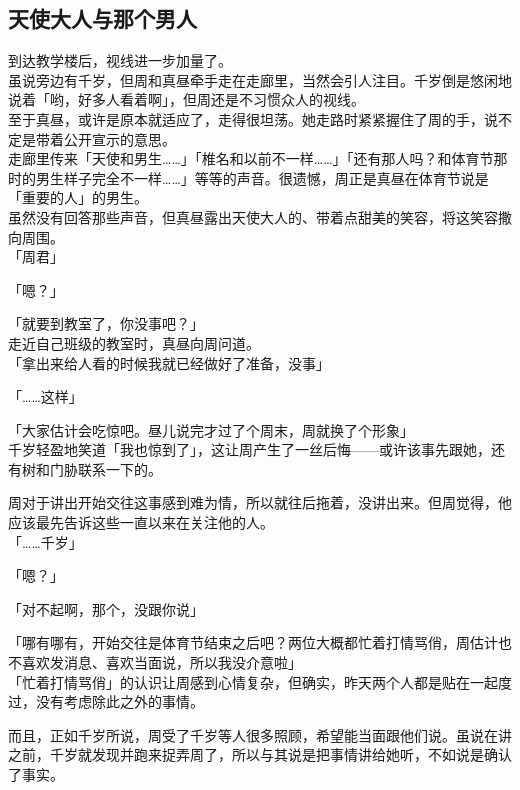 \subsection{天使大人与那个男人}

到达教学楼后，视线进一步加量了。\\

虽说旁边有千岁，但周和真昼牵手走在走廊里，当然会引人注目。千岁倒是悠闲地说着「哟，好多人看着啊」，但周还是不习惯众人的视线。\\

至于真昼，或许是原本就适应了，走得很坦荡。她走路时紧紧握住了周的手，说不定是带着公开宣示的意思。\\

走廊里传来「天使和男生……」「椎名和以前不一样……」「还有那人吗？和体育节那时的男生样子完全不一样……」等等的声音。很遗憾，周正是真昼在体育节说是「重要的人」的男生。\\

虽然没有回答那些声音，但真昼露出天使大人的、带着点甜美的笑容，将这笑容撒向周围。\\

「周君」

「嗯？」

「就要到教室了，你没事吧？」\\

走近自己班级的教室时，真昼向周问道。\\

「拿出来给人看的时候我就已经做好了准备，没事」

「……这样」

「大家估计会吃惊吧。昼儿说完才过了个周末，周就换了个形象」\\

千岁轻盈地笑道「我也惊到了」，这让周产生了一丝后悔——或许该事先跟她，还有树和门胁联系一下的。

周对于讲出开始交往这事感到难为情，所以就往后拖着，没讲出来。但周觉得，他应该最先告诉这些一直以来在关注他的人。\\

「……千岁」

「嗯？」

「对不起啊，那个，没跟你说」

「哪有哪有，开始交往是体育节结束之后吧？两位大概都忙着打情骂俏，周估计也不喜欢发消息、喜欢当面说，所以我没介意啦」\\

「忙着打情骂俏」的认识让周感到心情复杂，但确实，昨天两个人都是贴在一起度过，没有考虑除此之外的事情。

而且，正如千岁所说，周受了千岁等人很多照顾，希望能当面跟他们说。虽说在讲之前，千岁就发现并跑来捉弄周了，所以与其说是把事情讲给她听，不如说是确认了事实。\\

